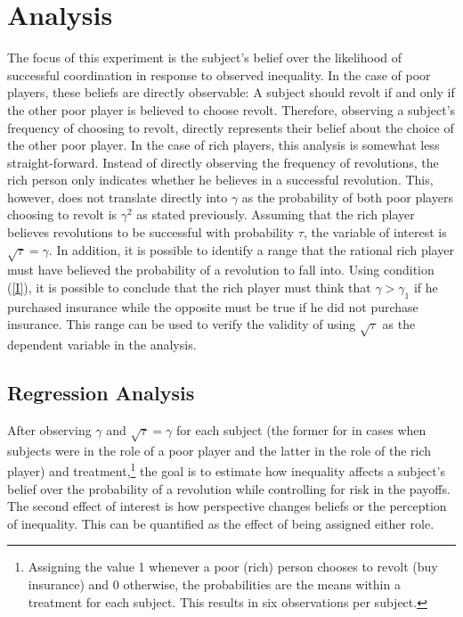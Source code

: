 \documentclass[12pt]{article}
\begin{document}
	\section{Analysis}
	The focus of this experiment is the subject's belief over the likelihood of 
	successful coordination in response to observed inequality. In the case of 
	poor players, these beliefs are directly observable: A subject should 
	revolt if and only if the other poor player is believed to choose revolt. 
	Therefore, observing a subject's frequency of choosing to revolt, directly 
	represents their belief about the choice of the other poor player. In the 
	case of rich players, this analysis is somewhat less straight-forward. 
	Instead of directly observing the frequency of revolutions, the rich person 
	only indicates whether he believes in a successful revolution. This, 
	however, does not translate directly into $\gamma$ as the probability of 
	both poor players choosing to revolt is $\gamma^2$ as stated previously.
	Assuming that the rich player believes revolutions to be successful with 
	probability $\tau$, the variable of interest is $\sqrt{\tau} = 
	\gamma$. 
	In addition, it is possible to 
	identify a range that the rational rich player must have believed the 
	probability of a revolution to fall into. Using condition (\ref{I}), it is 
	possible to conclude that the rich player must think that $\gamma>\gamma_1$ 
	if he purchased insurance while the opposite must be true if he did not 
	purchase insurance. This range can be used to verify the validity of using 
	$\sqrt{\tau}$ as the dependent variable in the analysis.
	
	\subsection{Regression Analysis}
	After observing $\gamma$ and $\sqrt{\tau}=\gamma$ for each subject (the 
	former for in cases when subjects were in the role of a poor player and the 
	latter in the role of the rich player) and treatment,\footnote{Assigning 
	the value 1 whenever a poor (rich) person chooses to revolt (buy insurance) 
	and 0 otherwise, the probabilities are the means within a treatment for 
	each 
	subject. This results in six observations per subject.} the goal is to 
	estimate how inequality affects a subject's belief over the probability of 
	a revolution while controlling for risk in the payoffs. The second effect 
	of interest is how perspective changes beliefs or the perception of 
	inequality. This can be quantified as the effect of being assigned either 
	role.
\end{document}
